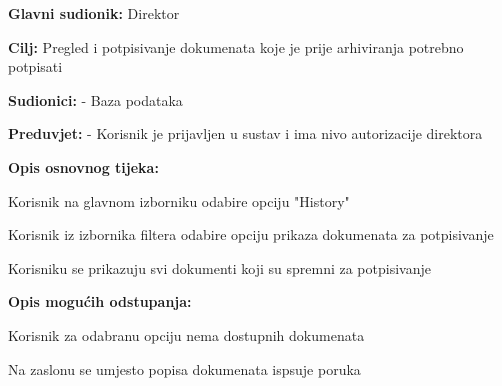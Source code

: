 					\noindent {}
						\begin{packed_item}
		
							\item \textbf{Glavni sudionik:} Direktor
							\item  \textbf{Cilj:} Pregled i potpisivanje dokumenata koje je prije arhiviranja potrebno potpisati
							\item  \textbf{Sudionici:} - Baza podataka
							\item  \textbf{Preduvjet:} - Korisnik je prijavljen u sustav i ima nivo autorizacije direktora
							\item  \textbf{Opis osnovnog tijeka:}
							
							\item[] \begin{packed_enum}
								\item Korisnik na glavnom izborniku odabire opciju "History"
								\item Korisnik iz izbornika filtera odabire opciju prikaza dokumenata za potpisivanje
								\item Korisniku se prikazuju svi dokumenti koji su spremni za potpisivanje
							\end{packed_enum}
							
							\item  \textbf{Opis mogućih odstupanja:}
							
							\item[] \begin{packed_item}
		
								\item[3.a]Korisnik za odabranu opciju nema dostupnih dokumenata
								\item[] \begin{packed_enum}
									\item Na zaslonu se umjesto popisa dokumenata ispsuje poruka
								\end{packed_enum}
							\end{packed_item}
						\end{packed_item}


